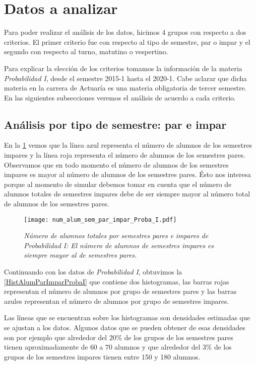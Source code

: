 \section{Datos a analizar} \label{DatosAnalizar}

Para poder realizar el análisis de los datos, hicimos 4 grupos con respecto a dos criterios. El primer criterio fue con respecto al tipo de semestre, par o impar y el segundo con respecto al turno, matutino o vespertino.

Para explicar la elección de los criterios tomamos la información de la materia \textit{Probabilidad I}, desde el semestre 2015-1 hasta el 2020-1. Cabe aclarar que dicha materia en la carrera de Actuaría es una materia obligatoria de tercer semestre. En las siguientes subsecciones veremos el análisis de acuerdo a cada criterio.

\subsection{Análisis por tipo de semestre: par e impar}

En la \figurename{\ref{ParImparProbaI}} vemos que la línea azul representa el número de alumnos de los semestres impares y la línea roja representa el número de alumnos de los semestres pares. Observamos que en todo momento el número de alumnos de los semestres impares es mayor al número de alumnos de los semestres pares. Ésto nos interesa porque al momento de simular debemos tomar en cuenta que el número de alumnos totales de semestres impares debe de ser siempre mayor al número total de alumnos de los semestres pares.

\begin{figure}[H]
\centering
\texttt{[image: num\_alum\_sem\_par\_impar\_Proba\_I.pdf]} %
\caption[\textit{Número de alumnos totales por semestres pares e impares: Probabilidad I}]{\textit{Número de alumnos totales por semestres pares e impares de Probabilidad I: El número de alumnos de semestres impares es siempre mayor al de semestres pares.}}\label{ParImparProbaI}
\end{figure}

Continuando con los datos de \textit{Probabilidad I}, obtuvimos la \figurename{\ref{HistAlumParImparProbaI}} que contiene dos histogramas, las barras rojas representan el número de alumnos por grupo de semestres pares y las barras azules representan el número de alumnos por grupo de semestres impares.

Las líneas que se encuentran sobre los histogramas son densidades estimadas que se ajustan a los datos. Algunos datos que se pueden obtener de esas densidades son por ejemplo que alrededor del $20\%$ de los grupos de los semestres pares tienen aproximadamente de $60$ a $70$ alumnos y que alrededor del $3\%$ de los grupos de los semestres impares tienen entre 150 y 180 alumnos.

